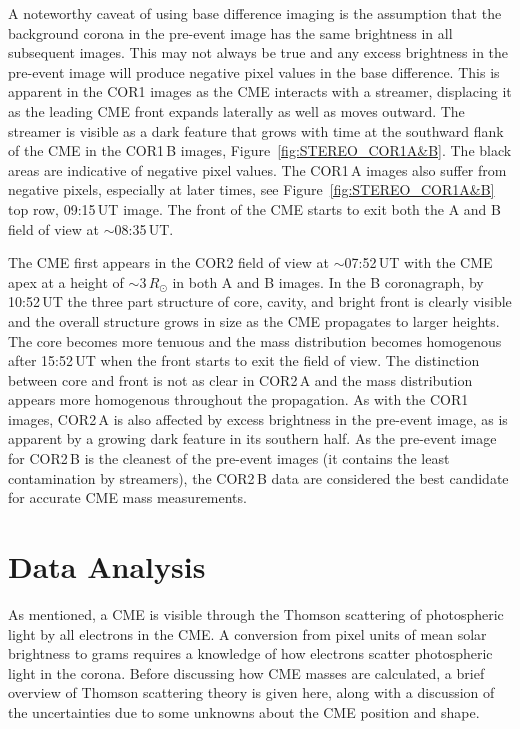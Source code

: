 A noteworthy caveat of using base difference imaging is the assumption that the background corona in the pre-event image has the same brightness in all subsequent images. This may not always be true and any excess brightness in the pre-event image will produce negative pixel values in the base difference. This is apparent in the COR1 images as the CME interacts with a streamer, displacing it as the leading CME front expands laterally as well as moves outward. The streamer is visible as a dark feature that grows with time at the southward flank of the CME in the COR1\,B images, Figure~\ref{fig:STEREO_COR1A&B}. The black areas are indicative of negative pixel values. The COR1\,A images also suffer from negative pixels, especially at later times, see Figure~\ref{fig:STEREO_COR1A&B} top row, 09:15\,UT image. 
The front of the CME starts to exit both the A and B field of view at $\sim$08:35\,UT.

The CME first appears in the COR2 field of view at $\sim$07:52\,UT with the CME apex at a height of $\sim$3\,$R_{\odot}$ in both A and B images. In the B coronagraph, by 10:52\,UT the three part structure of core, cavity, and bright front is clearly visible and the overall structure grows in size as the CME propagates to larger heights. The core becomes more tenuous and the mass distribution becomes homogenous after 15:52\,UT when the front starts to exit the field of view. The distinction between core and front is not as clear in COR2\,A and the mass distribution appears more homogenous throughout the propagation. As with the COR1 images, COR2\,A is also affected by excess brightness in the pre-event image, as is apparent by a growing dark feature in its southern half. As the pre-event image for COR2\,B is the cleanest of the pre-event images (it contains the least contamination by streamers), the COR2\,B data are considered the best candidate for accurate CME mass measurements. 



\section{Data Analysis}\label{sec:10}

As mentioned, a CME is visible through the Thomson scattering of photospheric light by all electrons in the CME.
A conversion from pixel units of mean solar brightness to grams requires a knowledge of how electrons scatter photospheric light in the corona. Before discussing how CME masses are calculated, a brief overview of Thomson scattering theory is given here, along with a discussion of the uncertainties due to some unknowns about the CME position and shape.

